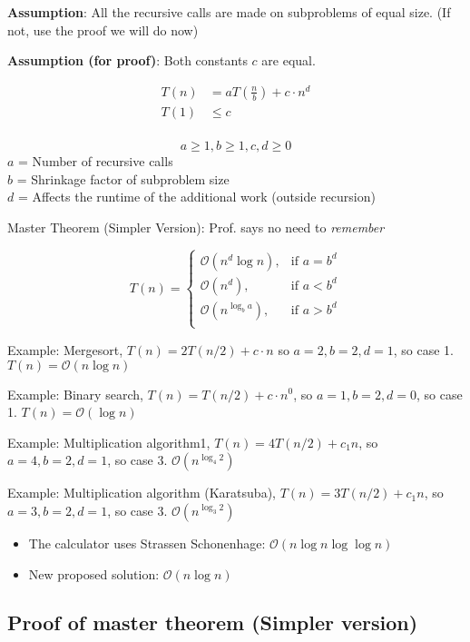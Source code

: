 \documentclass[a4paper
]{article}
\providecommand{\tightlist}{%
  \setlength{\itemsep}{0pt}\setlength{\parskip}{0pt}}
\begin{document}
\textbf{Assumption}: All the recursive calls are made on subproblems of
equal size. (If not, use the proof we will do now)

\textbf{Assumption (for proof)}: Both constants {\(c\)} are equal.

\[\begin{matrix}
{T(n)} & {= {aT\left( \frac{n}{b} \right)} + {c \cdot n^{d}}} \\
{T(1)} & {\leq c} \\
\end{matrix}\]

{\[a \geq 1,b \geq 1,c,d \geq 0\]}{\(a\)} = Number of recursive calls\\
{\(b\)} = Shrinkage factor of subproblem size\\
{\(d\)} = Affects the runtime of the additional work (outside recursion)

Master Theorem (Simpler Version): Prof. says no need to \emph{remember}

\[T(n) = \left\{ \begin{matrix}
{\mathcal{O}(n^{d}\log n),} & {\text{if~}a = b^{d}} \\
{\mathcal{O}(n^{d}),} & {\text{if~}a < b^{d}} \\
{\mathcal{O}(n^{\log_{b}a}),} & {\text{if~}a > b^{d}} \\
\end{matrix} \right.\]

Example: Mergesort, {\(T(n) = 2T(n/2) + c \cdot n\)} so
{\(a = 2,b = 2,d = 1\)}, so case 1. {\(T(n) = \mathcal{O}(n\log n)\)}

Example: Binary search, {\(T(n) = T(n/2) + c \cdot n^{0}\)}, so
{\(a = 1,b = 2,d = 0\)}, so case 1. {\(T(n) = \mathcal{O}(\log n)\)}

Example: Multiplication algorithm1, {\(T(n) = 4T(n/2) + c_{1}n\)}, so
{\(a = 4,b = 2,d = 1\)}, so case 3. {\(\mathcal{O}(n^{\log_{4}2})\)}

Example: Multiplication algorithm (Karatsuba),
{\(T(n) = 3T(n/2) + c_{1}n\)}, so {\(a = 3,b = 2,d = 1\)}, so case 3.
{\(\mathcal{O}(n^{\log_{3}2})\)}

\begin{itemize}
\tightlist
\item
  The calculator uses Strassen Schonenhage:
  {\(\mathcal{O}(n\log n\log\log n)\)}
\item
  New proposed solution: {\(\mathcal{O}(n\log n)\)}
\end{itemize}

\hypertarget{proof-of-master-theorem-simpler-version}{%
\subsection{Proof of master theorem (Simpler
version)}\label{proof-of-master-theorem-simpler-version}}
\end{document}
